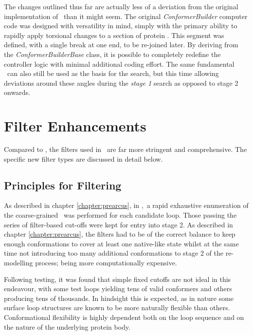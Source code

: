 The changes outlined thus far are actually less of a deviation from the original implementation of \prearcus\ than it might seem. The original \textsl{ConformerBuilder} computer code was designed with versatility in mind, simply with the primary ability to rapidly apply torsional changes to a section of protein \mainchain. This segment was defined, with a single break at one end, to be re-joined later. By deriving from the \mbox{\textsl{ConformerBuilderBase}} class, it is possible to completely redefine the controller logic with minimal additional coding effort. The same fundamental \anglesets\ can also still be used as the basis for the search, but this time allowing deviations around these angles during the \emph{stage 1} search as opposed to stage 2 onwards.
















\section{Filter Enhancements}
\label{section:arcus:filterdev}

Compared to \prearcus, the filters used in \arcus\ are far more stringent and comprehensive. The specific new filter types are discussed in detail below.


\subsection{Principles for Filtering}

As described in chapter \ref{chapter:prearcus}, in \prearcus,\ a rapid exhaustive enumeration of the coarse-grained \angleset\ was performed for each candidate loop. Those passing the series of filter-based cut-offs were kept for entry into stage 2. As described in chapter  \ref{chapter:prearcus}, the filters had to be of the correct balance to keep enough conformations to cover at least one native-like state whilst at the same time not introducing too many additional conformations to stage 2 of the re-modelling process; being more  computationally expensive.  

Following testing, it was found that simple fixed cutoffs are not ideal in this endeavour, with some test loops yielding tens of valid conformers and others producing tens of thousands.
In hindsight this is expected, as in nature some surface loop structures are known to be more naturally flexible than others. Conformational flexibility is highly dependent both on the loop sequence and on the nature of the underlying protein body.


